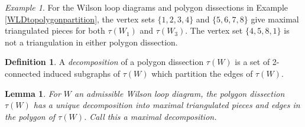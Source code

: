 \documentclass[11pt]{article}
\newtheorem{lem}[thm]{Lemma}
\theoremstyle{remark}
\newtheorem{eg}[thm]{Example}
\theoremstyle{definition}
\newtheorem{dfn}[thm]{Definition}
\begin{document}
\begin{eg} \label{eg: unique decomposition} For the Wilson loop diagrams and polygon dissections in Example \ref{WLDtopolygonpartition}, the vertex sets $\{1, 2, 3,4\}$ and $\{5, 6, 7, 8\}$ give maximal triangulated pieces for both $\tau(W_1)$ and $\tau(W_3)$. The vertex set $\{4,5, 8, 1\}$ is not a triangulation in either polygon dissection. 
\end{eg}

\begin{dfn}
 A {\em decomposition} of a polygon dissection $\tau(W)$ is a set of 2-connected induced subgraphs of $\tau(W)$ which partition the edges of $\tau(W)$.  
\end{dfn}

\begin{lem} \label{decompositionlem}
  For $W$ an admissible Wilson loop diagram, the polygon dissection $\tau(W)$ has a unique decomposition into maximal triangulated pieces and edges in the polygon of $\tau(W)$.  Call this a \emph{maximal decomposition}.
\end{lem}
\end{document}
